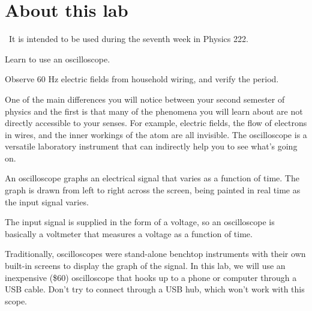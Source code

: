 \renewcommand\thechapter{c2.7}
\label{lab:covid-oscilloscope}

\section*{About this lab}

\covid\ 
It is intended to be used during the seventh week in Physics 222.

\apparatus
{}

\begin{goals}

\item[] Learn to use an oscilloscope.

\item[] Observe 60 Hz electric fields from household wiring, and verify the period.

\end{goals}

\introduction

One of the main differences you will notice between your
second semester of physics and the first is that many of the
phenomena you will learn about are not directly accessible
to your senses. For example, electric fields, the flow of
electrons in wires, and the inner workings of the atom are
all invisible.  The oscilloscope is a versatile laboratory
instrument that can indirectly help you to see what's going on. 


An oscilloscope graphs an electrical signal that varies as
a function of time.
The graph is drawn from left to right across the screen,
being painted in real time as the input signal varies.

The input signal is
supplied in the form of a voltage, so an oscilloscope is
basically a voltmeter that measures a voltage as a function of
time.

Traditionally, oscilloscopes were stand-alone benchtop instruments
with their own built-in screens to display the graph of the signal.
In this lab, we will use an inexpensive (\$60) oscilloscope that
hooks up to a phone or computer through a USB cable.
Don't try to connect through a USB hub, which won't work with this scope.



